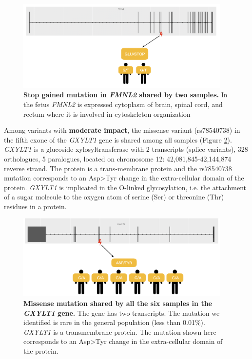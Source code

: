 \begin{figure}[H]
\centering
\includegraphics[width=0.95\textwidth]{fig/FMNL2_structure.png}
\decoRule
\caption{\textbf{Stop gained mutation in \textit{FMNL2} shared by two samples.} In the fetus \textit{FMNL2} is expressed cytoplasm of brain, spinal cord, and rectum where it is involved in cytoskeleton organization}
\label{fig:fmnl2}
\end{figure}

Among variants with \textbf{moderate impact}, the missense variant (rs78540738) in the fifth exone of the \textit{GXYLT1} gene is shared among all samples (Figure \ref{fig:gxylt1}). \textit{GXYLT1} is a glucoside xylosyltransferase with 2 transcripts (splice variants), 328 orthologues, 5 paralogues, located on chromosome 12: 42,081,845-42,144,874 reverse strand. The protein is a trans-membrane protein and the rs78540738 mutation corresponds to an Asp>Tyr change in the extra-cellular domain of the protein. \textit{GXYLT1} is implicated in the O-linked glycosylation\cite{sethi2010identification}, i.e. the attachment of a sugar molecule to the oxygen atom of serine (Ser) or threonine (Thr) residues in a protein.\\

\begin{figure}[H]
\centering
\includegraphics[width=0.95\textwidth]{fig/GXYLT1_structure.png}
\decoRule
\caption{\textbf{Missense mutation shared by all the six samples in the \textit{GXYLT1} gene.} The gene has two transcripts. The mutation we identified is rare in the general population (less than 0.01\%). \textit{GXYLT1} is a transmembrane protein. The mutation shown here corresponds  to  an  Asp>Tyr  change  in the extra-cellular domain of the protein.} 
\label{fig:gxylt1}
\end{figure}

